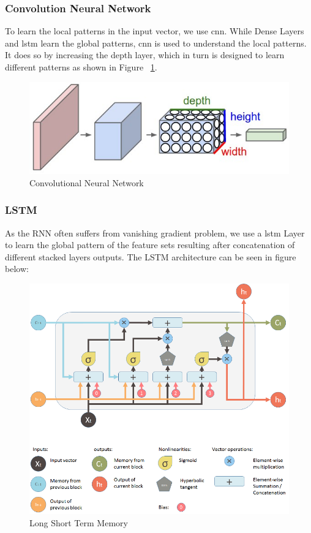 \subsubsection{Convolution Neural Network}
To learn the local patterns in the input vector, we use \acrshort{cnn}. While Dense Layers and \acrshort{lstm} learn the global patterns, \acrshort{cnn} is used to understand the local patterns. It does so by increasing the depth layer, which in turn is designed to learn different patterns as shown in Figure ~\ref{fig:cnn}.
\begin{figure}[ht]
  \centering
  \includegraphics[width=.5\linewidth]{mainmatter/3-Methodology/images/cnn.jpg}
  \caption{Convolutional Neural Network}
  \label{fig:cnn}
\end{figure}

\subsubsection{LSTM}
As the RNN often suffers from vanishing gradient problem, we use a \acrshort{lstm} Layer to learn the global pattern of the feature sets resulting after concatenation of different stacked layers outputs. The LSTM architecture can be seen in figure below:
\begin{figure}
  [ht]
  \centering
  \includegraphics[width=.5\linewidth]{mainmatter/3-Methodology/images/LSTMBlockDiagram.png}
  \caption{Long Short Term Memory}
  \label{fig:lstm}
\end{figure}



